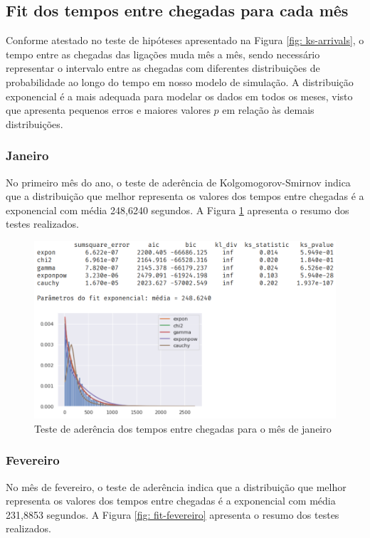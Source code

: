 \subsection{Fit dos tempos entre chegadas para cada mês} 
\label{section: fit-arrivals}
Conforme atestado no teste de hipóteses apresentado na Figura \ref*{fig: ks-arrivals}, o tempo entre as chegadas das ligações muda mês a mês, sendo necessário representar o intervalo entre as chegadas com diferentes distribuições de probabilidade ao longo do tempo em nosso modelo de simulação. A distribuição exponencial é a mais adequada para modelar os dados em todos os meses, visto que apresenta pequenos erros e maiores valores $p$ em relação às demais distribuições.

\subsubsection*{Janeiro}
No primeiro mês do ano, o teste de aderência de Kolgomogorov-Smirnov indica que a distribuição que melhor representa os valores dos tempos entre chegadas é a exponencial com média 248,6240 segundos. A Figura \ref*{fig: fit-janeiro} apresenta o resumo dos testes realizados.

\begin{figure}[H]
    \includegraphics[scale=0.8]{analise-de-dados/fit/fit-janeiro.png}
    \caption{Teste de aderência dos tempos entre chegadas para o mês de janeiro}
    \label{fig: fit-janeiro}
\end{figure}

\subsubsection*{Fevereiro}
No mês de fevereiro, o teste de aderência indica que a distribuição que melhor representa os valores dos tempos entre chegadas é a exponencial com média 231,8853 segundos. A Figura \ref*{fig: fit-fevereiro} apresenta o resumo dos testes realizados.

